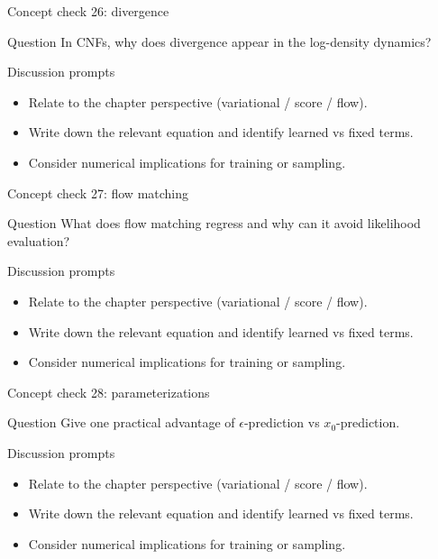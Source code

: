 \documentclass[aspectratio=169]{beamer}
\begin{document}
\begin{frame}{Concept check 26: divergence}
\begin{block}{Question}
In CNFs, why does divergence appear in the log-density dynamics?
\end{block}
\begin{block}{Discussion prompts}
\begin{itemize}
\item Relate to the chapter perspective (variational / score / flow).
\item Write down the relevant equation and identify learned vs fixed terms.
\item Consider numerical implications for training or sampling.
\end{itemize}
\end{block}
\end{frame}

\begin{frame}{Concept check 27: flow matching}
\begin{block}{Question}
What does flow matching regress and why can it avoid likelihood evaluation?
\end{block}
\begin{block}{Discussion prompts}
\begin{itemize}
\item Relate to the chapter perspective (variational / score / flow).
\item Write down the relevant equation and identify learned vs fixed terms.
\item Consider numerical implications for training or sampling.
\end{itemize}
\end{block}
\end{frame}

\begin{frame}{Concept check 28: parameterizations}
\begin{block}{Question}
Give one practical advantage of \(\epsilon\)-prediction vs \(x_0\)-prediction.
\end{block}
\begin{block}{Discussion prompts}
\begin{itemize}
\item Relate to the chapter perspective (variational / score / flow).
\item Write down the relevant equation and identify learned vs fixed terms.
\item Consider numerical implications for training or sampling.
\end{itemize}
\end{block}
\end{frame}
\end{document}
